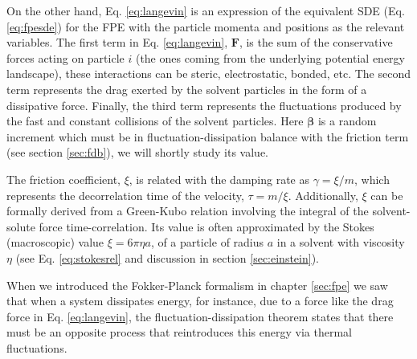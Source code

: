 \documentclass[ twoside,openright,titlepage,numbers=noenddot,%
headinclude,footinclude,cleardoublepage=empty,abstract=on,
BCOR=5mm,paper=b5,fontsize=11pt, dvipsnames
]{scrreprt}
\renewcommand{\vec}[1]{\bm{#1}}
\begin{document}
On the other hand, Eq. \eqref{eq:langevin} is an expression of the equivalent \gls{SDE} (Eq. \eqref{eq:fpesde}) for the \gls{FPE} with the particle momenta and positions as the relevant variables. The first term in Eq. \eqref{eq:langevin}, $\vec{F}$, is the sum of the conservative forces acting on particle $i$ (the ones coming from the underlying potential energy landscape), these interactions can be steric, electrostatic, bonded, etc.
The second term represents the drag exerted by the solvent particles in the form of a dissipative force.
Finally, the third term represents the fluctuations produced by the fast and constant collisions of the solvent particles. Here $\vec{\beta}$ is a random increment which must be in fluctuation-dissipation balance with the friction term (see section \ref{sec:fdb}), we will shortly study its value.


The friction coefficient, $\xi$, is related with the damping rate as $\gamma = \xi/m$, which represents the decorrelation time of the velocity, $\tau = m/\xi$. Additionally, $\xi$ can be formally derived from a Green-Kubo relation involving the integral of the solvent-solute force time-correlation\cite{Green1954,Kubo1957}. Its value is often approximated by the Stokes (macroscopic) value $\xi=6\pi\eta a$, of a particle of radius $a$ in a solvent with viscosity $\eta$ (see Eq. \eqref{eq:stokesrel} and discussion in section \ref{sec:einstein}).

When we introduced the Fokker-Planck formalism in chapter \ref{sec:fpe} we saw that when a system dissipates energy, for instance, due to a force like the drag force in Eq. \eqref{eq:langevin}, the fluctuation-dissipation theorem states that there must be an opposite process that reintroduces this energy via thermal fluctuations.
\end{document}
